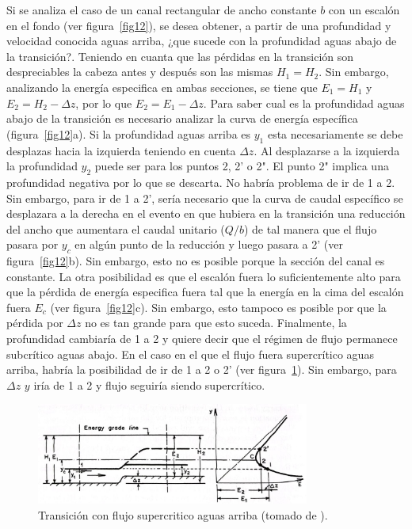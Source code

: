 \documentclass[11pt, oneside]{article}
\begin{document}
Si se analiza el caso de un canal rectangular de ancho constante $b$ con un escal\'on en el fondo (ver figura~\ref{fig12}), se desea obtener, a partir de una profundidad y velocidad conocida aguas arriba, ¿que sucede con la profundidad aguas abajo de la transici\'on?. Teniendo en cuanta que las p\'erdidas en la transici\'on son despreciables la cabeza antes y despu\'es son las mismas $H_1 = H_2$. Sin embargo, analizando la energ\'ia especifica en ambas secciones, se tiene que $E_1 = H_1$ y $E_2 = H_2-\Delta z$, por lo que $E_2 = E_1 - \Delta z$. Para saber cual es la profundidad aguas abajo de la transici\'on es necesario analizar la curva de energ\'ia espec\'ifica (figura~\ref{fig12}a). Si la profundidad aguas arriba es $y_1$ esta necesariamente se debe desplazas hacia la izquierda teniendo en cuenta $\Delta z$. Al desplazarse a la izquierda la profundidad $y_2$ puede ser para los puntos 2, 2' o 2". El punto 2" implica una profundidad negativa por lo que se descarta. No habr\'ia problema de ir de 1 a 2. Sin embargo, para ir de 1 a 2', ser\'ia necesario que la curva de caudal espec\'ifico se desplazara a la derecha en el evento en que hubiera en la transici\'on una reducci\'on del ancho que aumentara el caudal unitario ($Q/b$) de tal manera que el flujo pasara por $y_c$ en alg\'un punto de la reducci\'on y luego pasara a 2' (ver figura~\ref{fig12}b). Sin embargo, esto no es posible porque la secci\'on del canal es constante. La otra posibilidad es que el escalón fuera lo suficientemente alto para que la p\'erdida de energ\'ia especifica fuera tal que la energ\'ia en la cima del escal\'on fuera $E_c$ (ver figura~\ref{fig12}c). Sin embargo, esto tampoco es posible por que la p\'erdida por $\Delta z$ no es tan grande para que esto suceda. Finalmente, la profundidad cambiar\'ia de 1 a 2 y quiere decir que el r\'egimen de flujo permanece subcr\'itico aguas abajo. En el caso en el que el flujo fuera supercr\'itico aguas arriba, habr\'ia la posibilidad de ir de 1 a 2 o 2' (ver figura~\ref{fig13}). Sin embargo, para $\Delta z$ $y$ iría de 1 a 2 y flujo seguir\'ia siendo supercr\'itico. 

\begin{figure}[h]
\centering
\includegraphics[width=0.8\textwidth]{fig29.jpeg}
\caption{Transici\'on con flujo supercritico aguas arriba (tomado de \cite{Chau}).}
\label{fig13}
\end{figure}
\end{document}
